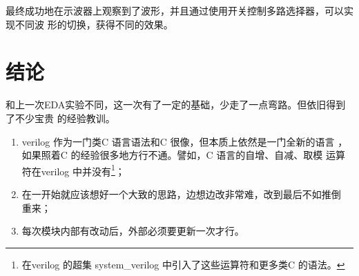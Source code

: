 \documentclass[twoside, openright]{article}
\begin{document}
最终成功地在示波器上观察到了波形，并且通过使用开关控制多路选择器，可以实现不同波
形的切换，获得不同的效果。

\newpage

\section{结论}%
\label{sec:结论}

和上一次EDA实验不同，这一次有了一定的基础，少走了一点弯路。但依旧得到了不少宝贵
的经验教训。

\begin{enumerate}

	\item verilog 作为一门类C 语言语法和C 很像，但本质上依然是一门全新的语言
		，如果照着C 的经验很多地方行不通。譬如，C 语言的自增、自减、取模
		运算符在verilog 中并没有\footnote{在verilog 的超集
		system\_verilog 中引入了这些运算符和更多类C 的语法。}；

	\item 在一开始就应该想好一个大致的思路，边想边改非常难，改到最后不如推倒
		重来；

	\item 每次模块内部有改动后，外部必须要更新一次才行。

\end{enumerate}


\setcounter{section}{0}




\end{document}
